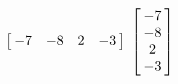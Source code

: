 {$\left[\hskip -3pt \begin{array}{cccc} -7&-8&2&-3\end{array}\hskip -3pt \right]$ }
{$ \left[\hskip -3pt \begin{array}{c} -7\\  -8\\  
2\\  -3\end{array}\hskip -3pt \right] $}



